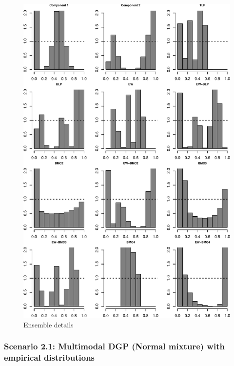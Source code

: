 \documentclass[
]{article}
\begin{document}
\begin{figure}[h]

{\centering \includegraphics{applied_blp_sim_files/figure-latex/unnamed-chunk-16-1} 

}

\caption{Ensemble details}\label{fig:unnamed-chunk-16}
\end{figure}
\clearpage

\hypertarget{scenario-2.1-multimodal-dgp-normal-mixture-with-empirical-distributions}{%
\subsubsection{Scenario 2.1: Multimodal DGP (Normal mixture) with
empirical
distributions}\label{scenario-2.1-multimodal-dgp-normal-mixture-with-empirical-distributions}}
\end{document}
